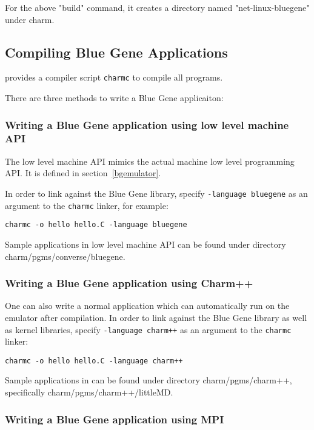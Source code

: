 For the above "build" command, it creates a directory named 
"net-linux-bluegene" under charm. 

\subsection{Compiling Blue Gene Applications}

\charmpp{} provides a compiler script {\tt charmc} to compile all programs.

There are three methods to write a Blue Gene applicaiton:

\subsubsection{Writing a Blue Gene application using low level machine API}
The low level machine API mimics the actual machine low level programming
API. It is defined in section~\ref{bgemulator}.

In order to link against the Blue Gene library, specify 
\texttt{-language bluegene} as an argument to the {\tt charmc} linker, 
for example:
\begin{verbatim}
charmc -o hello hello.C -language bluegene
\end{verbatim}

Sample applications in low level machine API can be found under directory
charm/pgms/converse/bluegene.

\subsubsection{Writing a Blue Gene application using Charm++}

One can also write a normal \charmpp{} application which can automatically
run on the emulator after compilation. In order to link against the Blue Gene 
library as well as \charmpp{} kernel libraries, specify 
\texttt{-language charm++} as an argument to the {\tt charmc} linker:
\begin{verbatim}
charmc -o hello hello.C -language charm++
\end{verbatim}

Sample applications in \charmpp{} can be found under directory
charm/pgms/charm++, specifically charm/pgms/charm++/littleMD.

\subsubsection{Writing a Blue Gene application using MPI}

